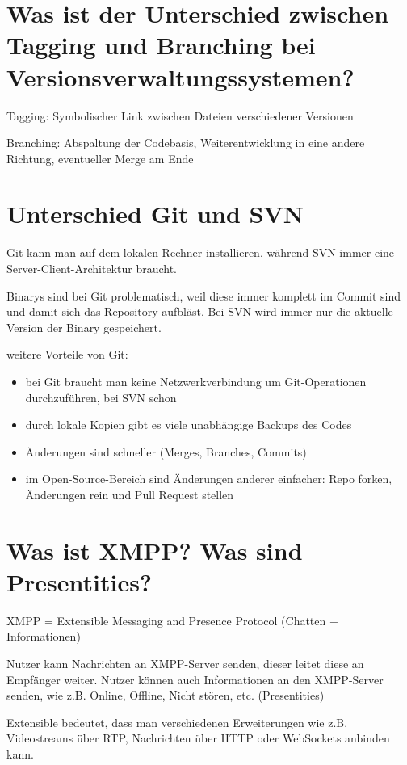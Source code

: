 \documentclass{article}
\begin{document}
	\section*{Was ist der Unterschied zwischen Tagging und Branching bei Versionsverwaltungssystemen?}
	
	Tagging: Symbolischer Link zwischen Dateien verschiedener Versionen
	
	Branching: Abspaltung der Codebasis, Weiterentwicklung in eine andere Richtung, eventueller Merge am Ende
	
	\section*{Unterschied Git und SVN}
	
	Git kann man auf dem lokalen Rechner installieren, während SVN immer eine Server-Client-Architektur braucht.
	
	Binarys sind bei Git problematisch, weil diese immer komplett im Commit sind und damit sich das Repository aufbläst. Bei SVN wird immer nur die aktuelle Version der Binary gespeichert.
	
	weitere Vorteile von Git:
	\begin{itemize}
		\item bei Git braucht man keine Netzwerkverbindung um Git-Operationen durchzuführen, bei SVN schon
		\item durch lokale Kopien gibt es viele unabhängige Backups des Codes
		\item Änderungen sind schneller (Merges, Branches, Commits)
		\item im Open-Source-Bereich sind Änderungen anderer einfacher: Repo forken, Änderungen rein und Pull Request stellen
	\end{itemize}
	
	\section*{Was ist XMPP? Was sind Presentities?}
	
	XMPP = Extensible Messaging and Presence Protocol (Chatten + Informationen)
	
	Nutzer kann Nachrichten an XMPP-Server senden, dieser leitet diese an Empfänger weiter. Nutzer können auch Informationen an den XMPP-Server senden, wie z.B. Online, Offline, Nicht stören, etc. (Presentities)
	
	Extensible bedeutet, dass man verschiedenen Erweiterungen wie z.B. Videostreams über RTP, Nachrichten über HTTP oder WebSockets anbinden kann.
	
\end{document}
